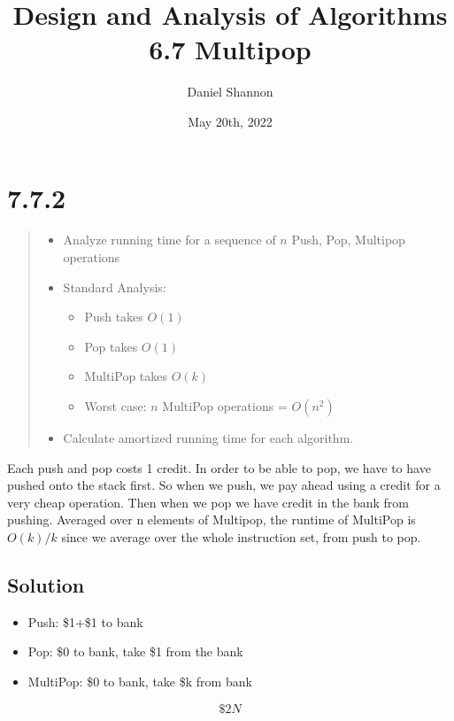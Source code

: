 \documentclass[12pt, letterpaper, twoside]{article}
\title{%
Design and Analysis of Algorithms\\
\large 6.7 Multipop
}
\author{Daniel Shannon}
\date{May 20th, 2022}
\begin{document}
\begin{titlepage}
\maketitle
\end{titlepage}

\section*{7.7.2}
\begin{quote}
\begin{itemize}
    \item Analyze running time for a sequence of $n$ Push, Pop, Multipop operations
    \item Standard Analysis:
    \begin{itemize}
        \item Push takes $O(1)$
        \item Pop takes $O(1)$
        \item MultiPop takes $O(k)$
        \item Worst case: $n$ MultiPop operations = $O(n^2)$
    \end{itemize}
    \item Calculate amortized running time for each algorithm.
\end{itemize}
\end{quote}
Each push and pop costs 1 credit. In order to be able to pop, we have to have pushed onto the stack first.
So when we push, we pay ahead using a credit for a very cheap operation. Then when we pop we have credit in the bank
from pushing. Averaged over n elements of Multipop, the runtime of MultiPop is $O(k)/k$ since we average over
the whole instruction set, from push to pop.

\subsection*{Solution}
\begin{itemize}
    \item Push: \$1+\$1 to bank
    \item Pop: \$0 to bank, take \$1 from the bank
    \item MultiPop: \$0 to bank, take \$k from bank
\end{itemize}
$$\$2N$$
\end{document}
